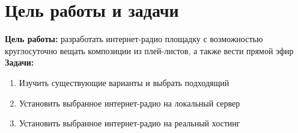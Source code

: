 \chapter{Цель работы и задачи}

\textbf{Цель работы:} разработать интернет-радио площадку с возможностью круглосуточно вещать композиции из плей-листов, а также вести прямой эфир\\


\textbf{Задачи: }
\begin{enumerate}
  \item Изучить существующие варианты и выбрать подходящий
  \item Установить выбранное интернет-радио на локальный сервер
  \item Установить выбранное интернет-радио на реальный хостинг
\end{enumerate}